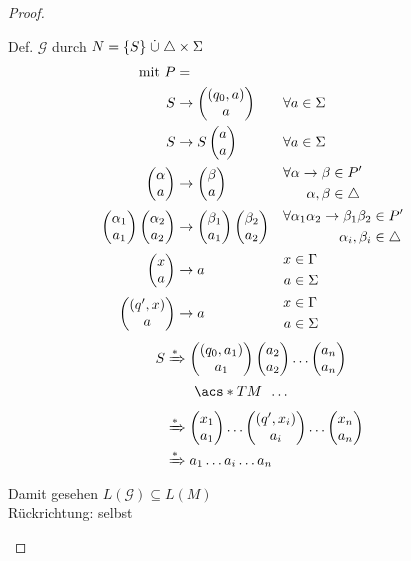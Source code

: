 \begin{proof}
\begin{itemize}
	Def. $\mathcal{G}$ durch $N = \{S\}\mathrel{\dot\cup}\triangle\times\Sigma$
	\begin{align*}
		\text{mit } P &= \\
		S &\-> \pmqty{(q_0,a)\\a} &&\forall a\in\Sigma\\
		S &\-> S\pmqty{a\\a} &&\forall a\in\Sigma\\
		\pmqty{\alpha\\a}
			&\-> \pmqty{\beta\\a}
			&&\begin{aligned}
				\forall \alpha\->\beta &\in P'\\
				\alpha,\beta &\in\triangle
			\end{aligned}\\
		\pmqty{\alpha_1\\a_1}\pmqty{\alpha_2\\a_2}
			&\-> \pmqty{\beta_1\\a_1}\pmqty{\beta_2\\a_2}
			&&\begin{aligned}
				\forall \alpha_1\alpha_2\->\beta_1\beta_2 &\in P'\\
				\alpha_i,\beta_i &\in\triangle
			\end{aligned}\\
		\pmqty{x\\a} &\-> a
			&&\begin{aligned}
				x&\in\Gamma\\
				a&\in\Sigma
			\end{aligned}\\
		\pmqty{(q',x)\\a} &\-> a
			&&\begin{aligned}
				x&\in\Gamma\\
				a&\in\Sigma
			\end{aligned}
	\end{align*}
	\begin{align*}
		S &\xRightarrow{*} \pmqty{(q_0,a_1)\\a_1}\pmqty{a_2\\a_2}\dots\pmqty{a_n\\a_n}\\
		&\phantom{{}\xRightarrow{*}{}}\ \acs*{TM}\ \,\dots\\
		&\xRightarrow{*} \pmqty{x_1\\a_1}\dots\pmqty{(q',x_i)\\a_i}\dots\pmqty{x_n\\a_n}\\
		&\xRightarrow{*} a_1\dots a_i\dots a_n
	\end{align*}
	Damit gesehen $L(\mathcal{G})\subseteq L(M)$\\
	Rückrichtung: selbst \qedhere
	\end{itemize}
\end{proof}

